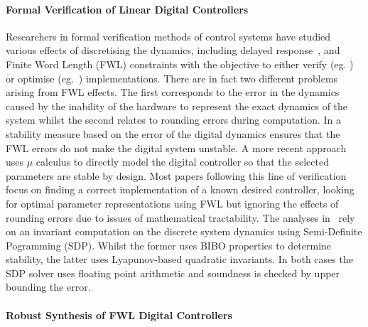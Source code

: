 \documentclass{sig-alternate-05-2015}
\begin{document}
\paragraph{Formal Verification of Linear Digital Controllers} 

Researchers in formal verification methods of control systems have studied
various effects of discretising the dynamics, including delayed
response~\cite{Duggirala2015}, and Finite Word Length (FWL) constraints with
the objective to either verify (eg.  \cite{daes20161}) or optimise
(eg.~\cite{oudjida2014design}) implementations.  There are in fact two
different problems arising from FWL effects.  The first corresponds to the
error in the dynamics caused by the inability of the hardware to represent
the exact dynamics of the system whilst the second relates to rounding
errors during computation.  In \cite{fialho1994stability} a stability
measure based on the error of the digital dynamics ensures that the FWL
errors do not make the digital system unstable.  A more recent
approach~\cite{DBLP:journals/automatica/WuLCC09} uses $\mu$ calculus to
directly model the digital controller so that the selected parameters are
stable by design.  Most papers following this line of verification focus on
finding a correct implementation of a known desired controller, looking for
optimal parameter representations using FWL but ignoring the effects of
rounding errors due to issues of mathematical tractability.  The analyses
in~\cite{DBLP:conf/hybrid/WangGRJF16,DBLP:conf/hybrid/RouxJG15} rely on an
invariant computation on the discrete system dynamics using Semi-Definite
Pogramming (SDP).  Whilst the former uses BIBO properties to determine
stability, the latter uses Lyapunov-based quadratic invariants.  In both
cases the SDP solver uses floating point arithmetic and soundness is checked
by upper bounding the error.

\paragraph{Robust Synthesis of FWL Digital Controllers}
\end{document}
